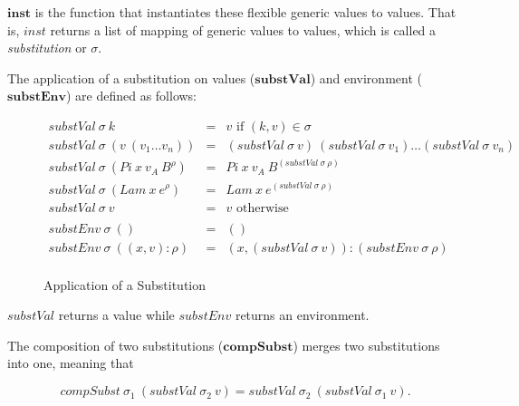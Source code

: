 $\boldsymbol{inst}$ is the function that instantiates these flexible generic values to values. That is, $inst$ returns a list of mapping of generic values to values, which is called a \emph{substitution} or $\sigma$.

The application of a substitution on values ($\boldsymbol{substVal}$) and environment ($\boldsymbol{substEnv}$) are defined as follows:

\begin{figure}[H]
  \begin{equation*}
    \begin{aligned}
      substVal \: \sigma \: k                            & = & v \textrm{ if } (k,v) \in \sigma                                                           \\
      substVal \: \sigma \: (v \: (v_1 \dots v_n))       & = & (substVal \: \sigma \: v) \: (substVal \: \sigma \: v_1) \dots (substVal \: \sigma \: v_n) \\
      substVal \: \sigma \: (Pi \: x \: v_A \: B^{\rho}) & = & Pi \: x \: v_A \: B^{(substVal \: \sigma \: \rho)}                                         \\
      substVal \: \sigma \: (Lam \: x \: e^{\rho})       & = & Lam \: x \: e^{(substVal \: \sigma \: \rho)}                                               \\
      substVal \: \sigma \: v                            & = & v \textrm{ otherwise}                                                                      \\
      \\
      substEnv \: \sigma \: ()                           & = & ()                                                                                         \\
      substEnv \: \sigma \: ((x,v):\rho)                 & = & (x,(substVal \: \sigma \: v)) : (substEnv \: \sigma \: \rho)                               \\
    \end{aligned}
  \end{equation*}
  \caption{Application of a Substitution}
\end{figure}

$substVal$ returns a value while $substEnv$ returns an environment.

The composition of two substitutions ($\boldsymbol{compSubst}$) merges two substitutions into one, meaning that

\[
  compSubst \: \sigma_1 \: (substVal \: \sigma_2 \: v) = substVal \: \sigma_2 \: (substVal \: \sigma_1 \: v).
\]

